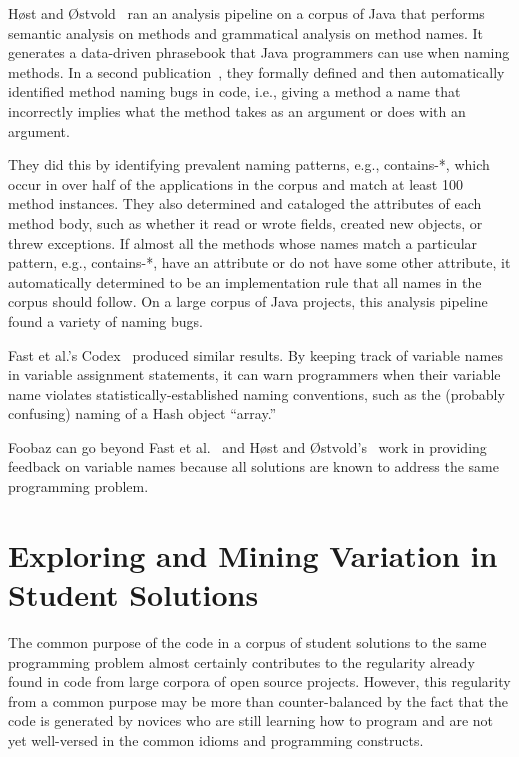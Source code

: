 H{{\o{}}}st and {{\O{}}}stvold~\cite{host2008java} ran an analysis pipeline on a corpus of Java that performs semantic analysis on methods and grammatical analysis on method names. It generates a data-driven phrasebook that Java programmers can use when naming methods. In a second publication~\cite{host2009debugging}, they formally defined and then automatically identified method naming bugs in code, i.e., giving a method a name that incorrectly implies what the method takes as an argument or does with an argument.

They did this by identifying prevalent naming patterns, e.g., contains-*, which occur in over half of the applications in the corpus and match at least 100 method instances. They also determined and cataloged the attributes of each method body, such as whether it read or wrote fields, created new objects, or threw exceptions. If almost all the methods whose names match a particular pattern, e.g., contains-*, have an attribute or do not have some other attribute, it automatically determined to be an implementation rule that all names in the corpus should follow. On a large corpus of Java projects, this analysis pipeline found a variety of naming bugs.

Fast et al.'s Codex~\cite{codex} produced similar results. By keeping track of variable names in variable assignment statements, it can warn programmers when their variable name violates statistically-established naming conventions, such as the (probably confusing) naming of a Hash object ``array.'' 

Foobaz can go beyond Fast et al.~\cite{codex} and H{{\o{}}}st and {{\O{}}}stvold's~\cite{host2008java,host2009debugging} work in providing feedback on variable names because all solutions are known to address the same programming problem.

\section{Exploring and Mining Variation in Student Solutions}

The common purpose of the code in a corpus of student solutions to the same programming problem almost certainly contributes to the regularity already found in code from large corpora of open source projects. However, this regularity from a common purpose may be more than counter-balanced by the fact that the code is generated by novices who are still learning how to program and are not yet well-versed in the common idioms and programming constructs. 

